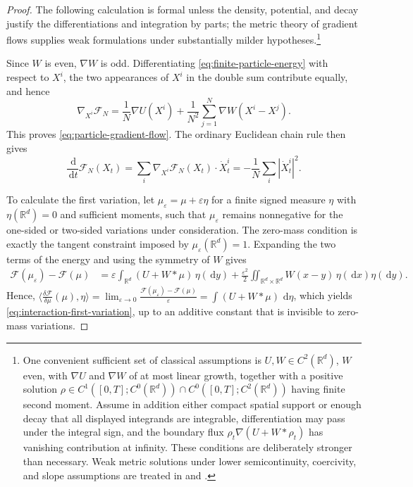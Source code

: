 \documentclass[11pt]{amsart}
\numberwithin{equation}{section}
\theoremstyle{plain}
\newcommand{\R}{\mathbb{R}}
\newcommand{\dd}{\,\mathrm{d}}
\newcommand{\abs}[1]{\left\lvert#1\right\rvert}
\begin{document}
\begin{proof}
The following calculation is formal unless the density, potential, and decay justify the differentiations and integration by parts; the metric theory of gradient flows supplies weak formulations under substantially milder hypotheses.\footnote{One convenient sufficient set of classical assumptions is
$U,W\in C^2(\R^d)$, $W$ even, with $\nabla U$ and $\nabla W$ of at most
linear growth, together with a positive solution
$\rho\in C^1([0,T];C^0(\R^d))\cap C^0([0,T];C^2(\R^d))$ having finite
second moment.  Assume in addition either compact spatial support or enough
decay that all displayed integrands are integrable, differentiation may pass
under the integral sign, and the boundary flux
$\rho_t\nabla(U+W*\rho_t)$ has vanishing contribution at infinity.  These
conditions are deliberately stronger than necessary.  Weak metric solutions
under lower semicontinuity, coercivity, and slope assumptions are treated in
\cite[Chapters~10--11]{AmbrosioGigliSavare2008} and
\cite[Chapters~23--24]{Villani2009}.}

Since $W$ is even, $\nabla W$ is odd.  Differentiating
\eqref{eq:finite-particle-energy} with respect to $X^i$, the two appearances
of $X^i$ in the double sum contribute equally, and hence
\[
 \nabla_{X^i}\mathcal F_N
 =\frac1N\nabla U(X^i)
 +\frac1{N^2}\sum_{j=1}^N\nabla W(X^i-X^j).
\]
This proves \eqref{eq:particle-gradient-flow}.  The ordinary Euclidean chain
rule then gives
\[
 \frac{\dd}{\dd t}\mathcal F_N(X_t)
 =\sum_i\nabla_{X^i}\mathcal F_N(X_t)\cdot\dot X_t^i
 =-\frac1N\sum_i\abs{\dot X_t^i}^2.
\]

To calculate the first variation, let $\mu_\varepsilon=\mu+\varepsilon\eta$ for a finite signed measure $\eta$ with $\eta(\R^d)=0$ and sufficient moments, such that $\mu_\varepsilon$ remains nonnegative for the one-sided or two-sided variations under consideration.  The zero-mass condition is exactly the tangent constraint imposed by $\mu_\varepsilon(\R^d)=1$.  Expanding the two terms of the energy and using
the symmetry of $W$ gives
\begin{align*}
\mathcal F(\mu_\varepsilon)-\mathcal F(\mu)
 &=\varepsilon\int_{\R^d}(U+W*\mu)\,\eta(\dd y)  +\frac{\varepsilon^2}{2}
   \iint_{\R^d\times\R^d}W(x-y)\,\eta(\dd x)\eta(\dd y).
\end{align*}
Hence,
$\langle \frac{\delta \mathcal F}{\delta\mu}(\mu), \eta\rangle
 =\lim_{\varepsilon\to 0}\frac{\mathcal F(\mu_\varepsilon)-\mathcal F(\mu)}{\varepsilon} = \int(U+W*\mu)\,\dd\eta$, which yields
\eqref{eq:interaction-first-variation}, up to an additive constant that is
invisible to zero-mass variations.


\end{proof}
\end{document}
